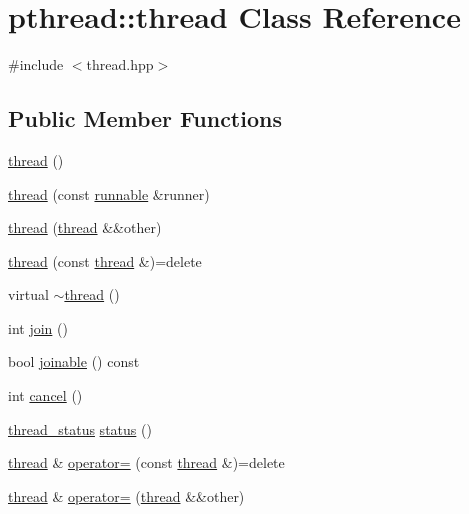 \hypertarget{classpthread_1_1thread}{}\section{pthread\+:\+:thread Class Reference}
\label{classpthread_1_1thread}


{\ttfamily \#include $<$thread.\+hpp$>$}

\subsection*{Public Member Functions}
\begin{DoxyCompactItemize}
\item 
\hyperlink{classpthread_1_1thread_a60ac91ccf3de6e36258aa741af015095}{thread} ()
\item 
\hyperlink{classpthread_1_1thread_a978cf4c628ece8a58e75c70f85b043ea}{thread} (const \hyperlink{classpthread_1_1runnable}{runnable} \&runner)
\item 
\hyperlink{classpthread_1_1thread_a928b41a7587eba3e5e39237b4b2f655a}{thread} (\hyperlink{classpthread_1_1thread}{thread} \&\&other)
\item 
\hyperlink{classpthread_1_1thread_ab9ddf5aa6697287269dc2804051b6378}{thread} (const \hyperlink{classpthread_1_1thread}{thread} \&)=delete
\item 
virtual \hyperlink{classpthread_1_1thread_aa4920e15c3a033f94c6be462c5cbcecf}{$\sim$thread} ()
\item 
int \hyperlink{classpthread_1_1thread_a93c4105becf4dea1b00efb30cd7228af}{join} ()
\item 
bool \hyperlink{classpthread_1_1thread_a14b07d05a78157bcb5ee42fc8dd17e35}{joinable} () const 
\item 
int \hyperlink{classpthread_1_1thread_a89b64810871feee5c2d2659f3ae2f668}{cancel} ()
\item 
\hyperlink{namespacepthread_ac4b6e78f3d72c946ace7a92f3bec4101}{thread\+\_\+status} \hyperlink{classpthread_1_1thread_a3e49c7d73cb8411258790ed2fc0cd818}{status} ()
\item 
\hyperlink{classpthread_1_1thread}{thread} \& \hyperlink{classpthread_1_1thread_a09903f6b3f396f2ea046c9c1606f0f61}{operator=} (const \hyperlink{classpthread_1_1thread}{thread} \&)=delete
\item 
\hyperlink{classpthread_1_1thread}{thread} \& \hyperlink{classpthread_1_1thread_a8f9ab7d43ad9aee0368ccc4778cf40d0}{operator=} (\hyperlink{classpthread_1_1thread}{thread} \&\&other)
\end{DoxyCompactItemize}


